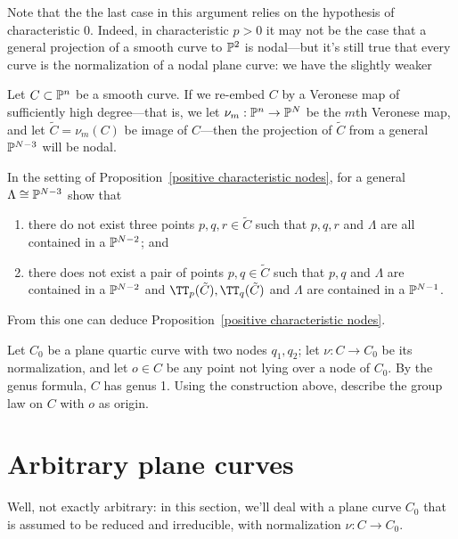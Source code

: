 Note that the the last case in this argument relies on the hypothesis of characteristic 0. Indeed, in characteristic $p > 0$ it may not be the case that a general projection of a smooth curve to $\PP^2$ is nodal---but it's still true that every curve is the normalization of a nodal plane curve: we have the slightly weaker

\begin{proposition}\label{positive characteristic nodes}
Let $C\subset \PP^n$ be a smooth curve. If we re-embed $C$ by a Veronese map of sufficiently high degree---that is, we let $\nu_m : \PP^n \to \PP^N$ be the $m$th Veronese map, and let $\tilde C = \nu_m(C)$ be image of $C$---then the projection of $\tilde C$ from a general $\PP^{N-3}$ will be nodal.
\end{proposition}

\begin{exercise}
In the setting of Proposition~\ref{positive characteristic nodes}, for a general $\Lambda \cong \PP^{N-3}$ show that
\begin{enumerate}
\item there do not exist three points $p,q,r \in \tilde C$ such that $p, q, r$ and $\Lambda$ are all contained in a $\PP^{N-2}$; and
\item there does not exist a pair of points $p, q \in \tilde C$ such that 
$p, q$ and $\Lambda$ are contained in a $\PP^{N-2}$ and $\TT_p(\tilde C), \TT_q(\tilde C)$ and $\Lambda$ are contained in a $\PP^{N-1}$.
\end{enumerate}
\end{exercise}

From this one can deduce Proposition~\ref{positive characteristic nodes}.

\begin{exercise}
Let $C_0$ be a plane quartic curve with two nodes $q_1, q_2$; let $\nu : C \to C_0$ be its normalization, and let $o \in C$ be any point not lying over a node of $C_0$.
By the genus formula, $C$ has genus 1. Using the construction above, describe the group law on $C$ with $o$ as origin.
\end{exercise}

\section{Arbitrary plane curves}\label{arbitrary plane curves}

Well, not exactly arbitrary: in this section, we'll deal with a plane curve $C_0$ that is assumed to be reduced and irreducible, with normalization $\nu : C \to C_0$. 

